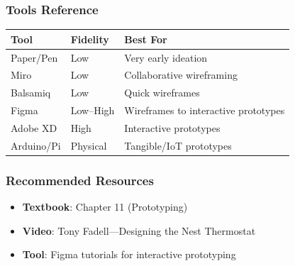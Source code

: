 \subsubsection*{Tools Reference}

\begin{center}
\renewcommand{\arraystretch}{1.3}
\begin{tabular}{@{} l l l @{}}
\toprule
\textbf{Tool} & \textbf{Fidelity} & \textbf{Best For} \\
\midrule
Paper/Pen & Low & Very early ideation \\
Miro & Low & Collaborative wireframing \\
Balsamiq & Low & Quick wireframes \\
Figma & Low--High & Wireframes to interactive prototypes \\
Adobe XD & High & Interactive prototypes \\
Arduino/Pi & Physical & Tangible/IoT prototypes \\
\bottomrule
\end{tabular}
\end{center}

\subsubsection*{Recommended Resources}
\begin{itemize}
  \item \textbf{Textbook}: Chapter 11 (Prototyping)
  \item \textbf{Video}: Tony Fadell---Designing the Nest Thermostat
  \item \textbf{Tool}: Figma tutorials for interactive prototyping
\end{itemize}


